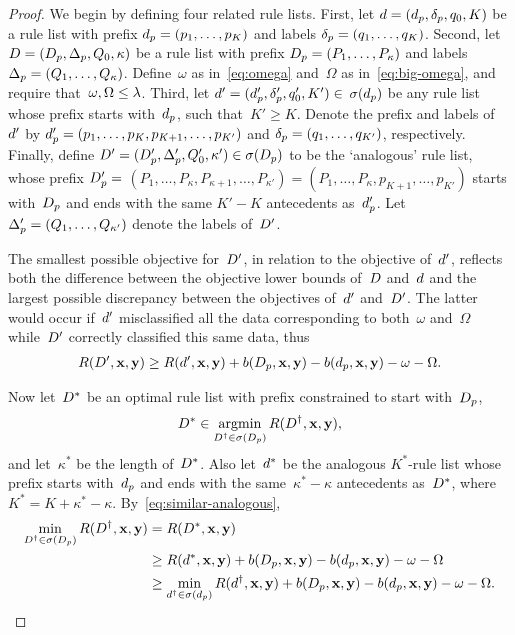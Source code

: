 \begin{arxiv}
\begin{proof}
We begin by defining four related rule lists.
%
First, let ${{d} = (d_p, \delta_p, q_0, K)}$
be a rule list with prefix ${d_p = (p_1, \dots, p_K)}$
and labels ${\delta_p = (q_1, \dots, q_K)}$.
%
Second, let ${{D} = (D_p, \Delta_p, Q_0, \kappa)}$
be a rule list with prefix ${D_p = (P_1, \dots, P_\kappa)}$
and labels ${\Delta_p = (Q_1, \dots, Q_\kappa)}$.
%
Define~$\omega$ as in~\eqref{eq:omega}
and~$\Omega$ as in~\eqref{eq:big-omega},
and require that~${\omega, \Omega \le {\lambda}}$.
%
Third, let ${{d}' = (d_p', \delta_p', q_0', K') \in}$
${\sigma(d_p)}$ be any rule list
whose prefix starts with~$d_p$, such that~${K' \ge K}$.
%
Denote the prefix and labels of~${d}'$ by
${d_p' = (p_1, \dots, p_K, p_{K+1}, \dots, p_{K'})}$
and ${\delta_p = (q_1, \dots, q_{K'})}$,
respectively.
%
Finally, define
${{D}' = (D_p', \Delta_p', Q_0', \kappa') \in \sigma(D_p)}$
to be the `analogous' rule list, \ie whose prefix
${D_p' =}$ ${(P_1, \dots, P_\kappa, P_{\kappa+1}, \dots, P_{\kappa'})
= (P_1, \dots, P_\kappa, p_{K+1}, \dots, p_{K'})}$
starts with~$D_p$ and ends with the same ${K'-K}$
antecedents as~$d_p'$.
%
Let ${\Delta_p' = (Q_1, \dots, Q_{\kappa'})}$
denote the labels of~${D}'$.

%
The smallest possible objective for~${D}'$, in relation
to the objective of~${d}'$, reflects both the difference
between the objective lower bounds of~${D}$ and~${d}$
and the largest possible discrepancy between the
objectives of~${d}'$ and~${D}'$.
%
The latter would occur if~${d}'$ misclassified all the data
corresponding to both~$\omega$ and~$\Omega$ while~${D}'$
correctly classified this same data, thus
\begin{align}
R({D}', \mathbf{x}, \mathbf{y}) \ge R({d}', \mathbf{x}, \mathbf{y})
  + b(D_p, \mathbf{x}, \mathbf{y}) - b(d_p, \mathbf{x}, \mathbf{y}) - \omega - \Omega.
\label{eq:similar-analogous}
\end{align}
%

Now let~${D}^*$ be an optimal rule list with prefix
constrained to start with~$D_p$,
\begin{align}
{D}^* \in \operatorname*{argmin}_{{D}^\dagger \in \sigma(D_p)} R({D}^\dagger, \mathbf{x}, \mathbf{y}),
\end{align}
and let~$\kappa^*$ be the length of~${D}^*$.
%
Also let~${d}^*$ be the analogous $K^*$-rule list whose prefix
starts with~$d_p$ and ends with the same~${\kappa^* - \kappa}$
antecedents as~${D}^*$, where~${K^* = K + \kappa^* - \kappa}$.
%
By~\eqref{eq:similar-analogous},
\begin{align}
\min_{{D}^\dagger \in \sigma(D_p)} R({D}^\dagger, \mathbf{x}, \mathbf{y})
&= R({D}^*, \mathbf{x}, \mathbf{y}) \nonumber \\
&\ge R({d}^*, \mathbf{x}, \mathbf{y})
  + b(D_p, \mathbf{x}, \mathbf{y}) - b(d_p, \mathbf{x}, \mathbf{y}) - \omega - \Omega \nonumber \\
&\ge \min_{{d}^\dagger \in \sigma(d_p)} R({d}^\dagger, \mathbf{x}, \mathbf{y})
  + b(D_p, \mathbf{x}, \mathbf{y}) - b(d_p, \mathbf{x}, \mathbf{y}) - \omega - \Omega.
\end{align}


\end{proof}
\end{arxiv}
